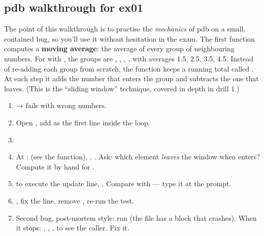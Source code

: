 \documentclass[10pt,a4paper]{article}
\begin{document}
\subsection{pdb walkthrough for ex01}
The point of this walkthrough is to practise the \emph{mechanics} of pdb on a small, contained bug, so you’ll use it without hesitation in the exam.
The first function computes a \textbf{moving average}: the average of every group of  neighbouring numbers. For  with , the groups are \code{[1,\allowbreak{}\ 2]}, \code{[2,\allowbreak{}\ 3]}, \code{[3,\allowbreak{}\ 4]}, \code{[4,\allowbreak{}\ 5]}, with averages 1.5, 2.5, 3.5, 4.5. Instead of re-adding each group from scratch, the function keeps a running total called . At each step it adds the number that enters the group and subtracts the one that leaves. (This is the “sliding window” technique, covered in depth in drill 1.)
\begin{enumerate}
\item {} →  fails with wrong numbers.
\item Open , add  as the first line inside the  loop.
\item {}
\item At :  (see the function), , . Ask: which element \emph{leaves} the window when  enters? Compute it by hand for .
\item {} to execute the update line, . Compare with  — type it at the prompt.
\item {}, fix the line, remove , re-run the test.
\item Second bug, post-mortem style: run  (the file has a  block that crashes). When it stops: , , ,  to see the caller. Fix it.
\end{enumerate}
\end{document}

